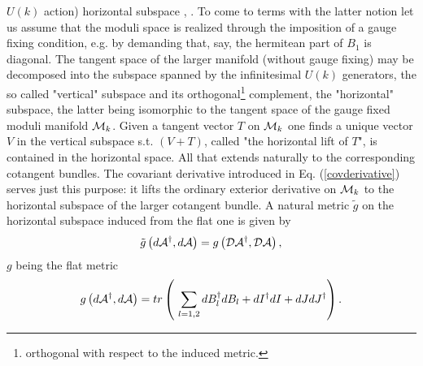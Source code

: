 \documentclass[a4paper,12pt]{article}
\begin{document}
$U(k)$ action) horizontal subspace \cite{HKLR}, \cite{BF}. To come
to terms with the latter notion let us assume that the moduli
space is realized through the imposition of a gauge fixing
condition, e.g. by demanding that, say, the hermitean part of
$B_1$ is diagonal. The tangent space of the larger manifold
(without gauge fixing) may be decomposed into the subspace spanned
by the infinitesimal $U(k)$ generators, the so called "vertical"
subspace and its orthogonal\footnote{orthogonal with respect to
the induced metric.} complement, the "horizontal" subspace, the
latter being isomorphic to the tangent space of the gauge fixed
moduli manifold ${\cal M}_k$. Given a tangent vector $T$ on ${\cal
M}_k$ one finds a unique vector $V$ in the vertical subspace s.t.
$(V+T)$, called "the horizontal lift of $T$", is contained in the
horizontal space. All that extends naturally to the corresponding
cotangent bundles. The covariant derivative introduced in Eq.
(\ref{covderivative}) serves just this purpose: it lifts the
ordinary exterior derivative on ${\cal M}_k$ to the horizontal
subspace of the larger cotangent bundle. A natural metric ${\tilde
g}$ on the horizontal subspace induced from the flat one is given
by
\begin{equation}
{\tilde g}\left(d {\cal A}^{\dagger}, d {\cal A}\right)=g \left({\cal D} {\cal A}^{\dagger}, {\cal D} {\cal
A}\right),
\end{equation}
$g$ being the flat metric
\begin{equation}
g\left(d {\cal A}^{\dagger}, d {\cal A}\right)=tr \left( \, \,  \sum_{l=1,2} dB_l^{\dagger} dB_l +dI^{\dagger}
dI+dJ dJ^{\dagger}\right).
\end{equation}
\end{document}
